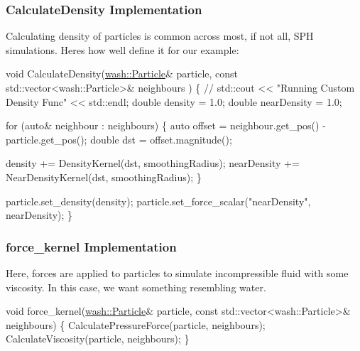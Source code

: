 \subsubsection*{Calculate\+Density Implementation}

Calculating density of particles is common across most, if not all, S\+PH simulations. Here\textquotesingle{}s how we\textquotesingle{}ll define it for our example\+:


\begin{DoxyCode}
\textcolor{keywordtype}{void} CalculateDensity(\mbox{\hyperlink{classwash_1_1Particle}{wash::Particle}}& particle, \textcolor{keyword}{const} std::vector<wash::Particle>& neighbours
      ) \{
    \textcolor{comment}{// std::cout << "Running Custom Density Func" << std::endl;}
    \textcolor{keywordtype}{double} density = 1.0;
    \textcolor{keywordtype}{double} nearDensity = 1.0;

    \textcolor{keywordflow}{for} (\textcolor{keyword}{auto}& neighbour : neighbours) \{
        \textcolor{keyword}{auto} offset = neighbour.get\_pos() - particle.get\_pos();
        \textcolor{keywordtype}{double} dst = offset.magnitude();

        density += DensityKernel(dst, smoothingRadius);
        nearDensity += NearDensityKernel(dst, smoothingRadius);
    \}

    particle.set\_density(density);
    particle.set\_force\_scalar(\textcolor{stringliteral}{"nearDensity"}, nearDensity);
\}
\end{DoxyCode}


\subsubsection*{force\+\_\+kernel Implementation}

Here, forces are applied to particles to simulate incompressible fluid with some viscosity. In this case, we want something resembling water. 
\begin{DoxyCode}
\textcolor{keywordtype}{void} force\_kernel(\mbox{\hyperlink{classwash_1_1Particle}{wash::Particle}}& particle, \textcolor{keyword}{const} std::vector<wash::Particle>& neighbours) \{
    CalculatePressureForce(particle, neighbours);
    CalculateViscosity(particle, neighbours);
\}
\end{DoxyCode}



